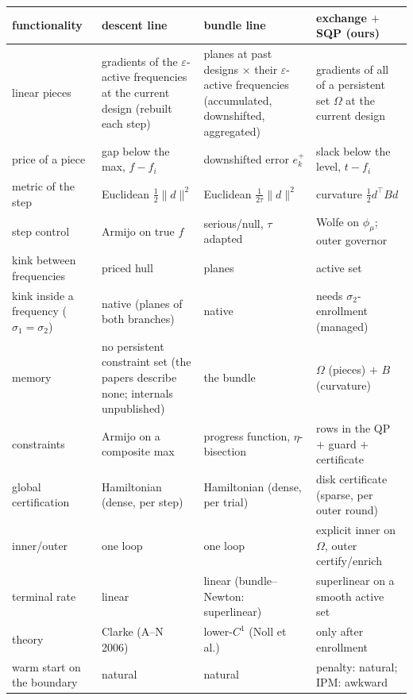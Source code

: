 \documentclass[11pt,a4paper]{article}
\newcommand{\eps}{\varepsilon}
\newcommand{\T}{^{\!\top}}
\newcommand{\revb}[1]{#1}
\begin{document}
\begin{center}\small
\begin{tabular}{p{}p{}p{}p{}}
\toprule
functionality & descent line & bundle line & exchange $+$ SQP (ours) \\
\midrule
linear pieces & gradients of the $\eps$-active frequencies at the current design (rebuilt each step) & planes at past designs $\times$ their $\eps$-active frequencies (accumulated, downshifted, aggregated) & gradients of all of a persistent set $\Omega$ at the current design \\
price of a piece & gap below the max, $f-f_i$ & downshifted error $e_k^+$ & slack below the level, $t-f_i$ \\
metric of the step & Euclidean $\tfrac12\|d\|^2$ & Euclidean $\tfrac1{2\tau}\|d\|^2$ & curvature $\tfrac12d\T Bd$ \\
step control & Armijo on true $f$ & serious/null, $\tau$ adapted & Wolfe on $\phi_\mu$; outer governor \\
kink between frequencies & priced hull & planes & active set \\
kink inside a frequency ($\sigma_1{=}\sigma_2$) & native (planes of both branches) & native & needs $\sigma_2$-enrollment (managed) \\
memory & \revb{no persistent constraint set (the papers describe none; internals unpublished)} & the bundle & $\Omega$ (pieces) $+$ $B$ (curvature) \\
constraints & Armijo on a composite max & progress function, $\eta$-bisection & rows in the QP $+$ guard $+$ certificate \\
global certification & Hamiltonian (dense, per step) & Hamiltonian (dense, per trial) & disk certificate (sparse, per outer round) \\
inner/outer & one loop & one loop & explicit inner on $\Omega$, outer certify/enrich \\
terminal rate & linear & linear (bundle--Newton: superlinear) & superlinear on a smooth active set \\
theory & Clarke (A--N 2006) & lower-$C^1$ (Noll et al.) & only after enrollment \\
warm start on the boundary & natural & natural & penalty: natural; IPM: awkward \\
\bottomrule
\end{tabular}
\end{center}
\end{document}
